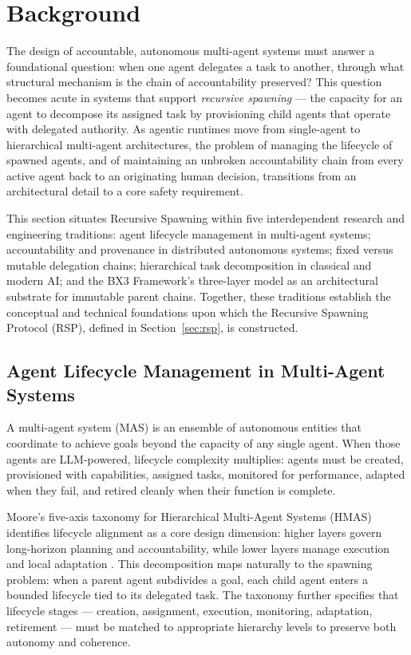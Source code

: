 \section{Background}
\label{sec:background}

The design of accountable, autonomous multi-agent systems must answer a foundational question: when one agent delegates a task to another, through what structural mechanism is the chain of accountability preserved? This question becomes acute in systems that support \emph{recursive spawning} — the capacity for an agent to decompose its assigned task by provisioning child agents that operate with delegated authority. As agentic runtimes move from single-agent to hierarchical multi-agent architectures, the problem of managing the lifecycle of spawned agents, and of maintaining an unbroken accountability chain from every active agent back to an originating human decision, transitions from an architectural detail to a core safety requirement.

This section situates Recursive Spawning within five interdependent research and engineering traditions: agent lifecycle management in multi-agent systems; accountability and provenance in distributed autonomous systems; fixed versus mutable delegation chains; hierarchical task decomposition in classical and modern AI; and the BX3 Framework's three-layer model as an architectural substrate for immutable parent chains. Together, these traditions establish the conceptual and technical foundations upon which the Recursive Spawning Protocol (RSP), defined in Section~\ref{sec:rsp}, is constructed.

\subsection{Agent Lifecycle Management in Multi-Agent Systems}

A multi-agent system (MAS) is an ensemble of autonomous entities that coordinate to achieve goals beyond the capacity of any single agent. When those agents are LLM-powered, lifecycle complexity multiplies: agents must be created, provisioned with capabilities, assigned tasks, monitored for performance, adapted when they fail, and retired cleanly when their function is complete.

Moore's five-axis taxonomy for Hierarchical Multi-Agent Systems (HMAS) identifies lifecycle alignment as a core design dimension: higher layers govern long-horizon planning and accountability, while lower layers manage execution and local adaptation \cite{moore2025hmas}. This decomposition maps naturally to the spawning problem: when a parent agent subdivides a goal, each child agent enters a bounded lifecycle tied to its delegated task. The taxonomy further specifies that lifecycle stages — creation, assignment, execution, monitoring, adaptation, retirement — must be matched to appropriate hierarchy levels to preserve both autonomy and coherence.

